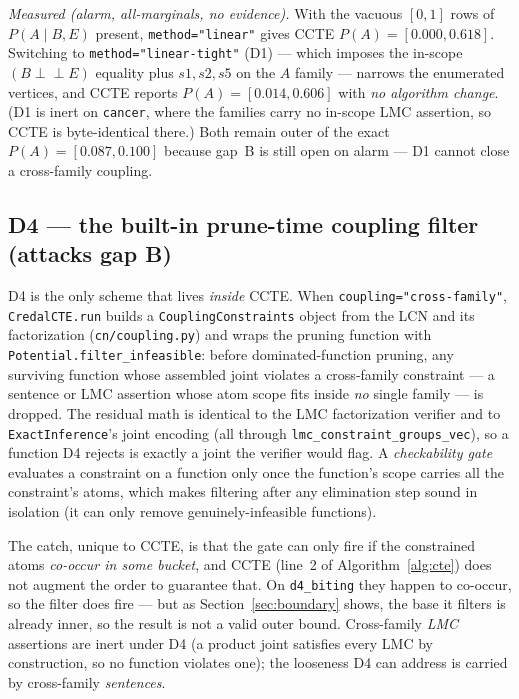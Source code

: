 \documentclass[11pt]{article}
\newcommand{\indep}{\perp\!\!\!\perp}
\begin{document}
\smallskip\noindent\emph{Measured (alarm, all-marginals, no evidence).} With the vacuous
$[0,1]$ rows of $P(A\mid B,E)$ present, \texttt{method="linear"} gives CCTE
$P(A)=[0.000,0.618]$. Switching to \texttt{method="linear-tight"} (D1) --- which imposes the
in-scope $(B\indep E)$ equality plus $s1,s2,s5$ on the $A$ family --- narrows the enumerated
vertices, and CCTE reports $P(A)=[0.014,0.606]$ with \emph{no algorithm change}. (D1 is inert on
\texttt{cancer}, where the families carry no in-scope LMC assertion, so CCTE is byte-identical
there.) Both remain outer of the exact $P(A)=[0.087,0.100]$ because gap~B is still open on alarm
--- D1 cannot close a cross-family coupling.

\subsection{D4 --- the built-in prune-time coupling filter (attacks gap B)}\label{sec:d4}
D4 is the only scheme that lives \emph{inside} CCTE. When \texttt{coupling="cross-family"},
\texttt{CredalCTE.run} builds a \texttt{CouplingConstraints} object from the LCN and its
factorization (\texttt{cn/coupling.py}) and wraps the pruning function with
\texttt{Potential.filter\_infeasible}: before dominated-function pruning, any surviving
function whose assembled joint violates a cross-family constraint --- a sentence or LMC assertion
whose atom scope fits inside \emph{no} single family --- is dropped. The residual math is
identical to the LMC factorization verifier and to \texttt{ExactInference}'s joint encoding
(all through \texttt{lmc\_constraint\_groups\_vec}), so a function D4 rejects is exactly a joint
the verifier would flag. A \emph{checkability gate} evaluates a constraint on a function only
once the function's scope carries all the constraint's atoms, which makes filtering after any
elimination step sound in isolation (it can only remove genuinely-infeasible functions).

The catch, unique to CCTE, is that the gate can only fire if the constrained atoms
\emph{co-occur in some bucket}, and CCTE (line~2 of Algorithm~\ref{alg:cte}) does not augment the
order to guarantee that. On \texttt{d4\_biting} they happen to co-occur, so the filter does fire
--- but as Section~\ref{sec:boundary} shows, the base it filters is already inner, so the result
is not a valid outer bound. Cross-family \emph{LMC} assertions are inert under D4 (a product
joint satisfies every LMC by construction, so no function violates one); the looseness D4 can
address is carried by cross-family \emph{sentences}.
\end{document}
